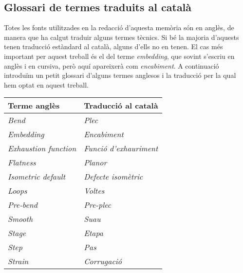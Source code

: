 \subsection*{Glossari de termes traduits al català}
Totes les fonts utilitzades en la redacció d'aquesta memòria són en anglès, de manera que ha calgut traduir alguns termes tècnics. Si bé la majoria d'aquests tenen traducció estàndard al català, alguns d'ells no en tenen. El cas més important per aquest treball és el del terme \textit{embedding}, que sovint s'escriu en anglès i en cursiva, però aquí apareixerà com \textit{encabiment}. A continuació introduïm un petit glossari d'alguns termes anglesos i la traducció per la qual hem optat en aquest treball. 

\begin{center}
    \begin{tabular}{ll}
    \hline
    \textbf{Terme anglès} & \textbf{Traducció al català} \\
    \hline
    \textit{Bend} & \textit{Plec} \\
    \textit{Embedding} & \textit{Encabiment} \\
    \textit{Exhaustion function} & \textit{Funció d'exhauriment} \\
    \textit{Flatness} & \textit{Planor} \\
    \textit{Isometric default} & \textit{Defecte isomètric} \\
    \textit{Loops} & \textit{Voltes} \\
    \textit{Pre-bend} & \textit{Pre-plec} \\
    \textit{Smooth} & \textit{Suau} \\
    \textit{Stage} & \textit{Etapa} \\
    \textit{Step} & \textit{Pas} \\
    \textit{Strain} & \textit{Corrugació} \\
    \hline
    \end{tabular}
\end{center}
\newpage
{}
\setcounter{page}{1}

